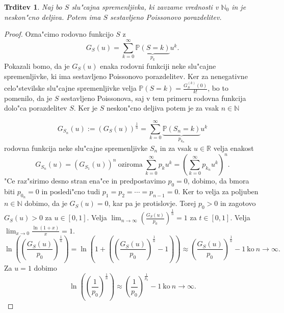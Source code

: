 \documentclass[12pt, a4paper, reqno]{amsart}
\theoremstyle{definition}
\theoremstyle{plain}
\newtheorem{trditev}[definicija]{Trditev}
\newcommand{\R}{\mathbb{R}}
\newcommand{\N}{\mathbb{N}}
\newcommand{\Prob}{\mathbb{P}}
\newcommand{\1}{\mathds{1}}
\begin{document}
    \begin{trditev}
        Naj bo $S$ slu"cajna spremenljivka, ki zavzame vrednosti v $\N_0$ in je neskon"cno deljiva.
        Potem ima $S$ sestavljeno Poissonovo porazdelitev.
        \label{trd:neskoncnoDeljivaYslediCPD}
    \end{trditev}

    \begin{proof}
        Ozna"cimo rodovno funkcijo $S$ z 
        \begin{equation*}
            G_S(u) = \sum_{k = 0}^\infty \underbrace{\Prob\left(S = k\right)}_{p_k}u^k.
        \end{equation*} 
        Pokazali bomo, da je $G_S(u)$ enaka rodovni funkciji neke slu"cajne spremenljivke, ki ima sestavljeno
        Poissonovo porazdelitev. Ker za nenegativne celo"stevilske slu"cajne spremenljivke velja 
        $\Prob\left(S = k\right) = \frac{G_S^{(k)}(0)}{k!}$, bo to pomenilo, da je $S$ sestavljeno Poissonova, 
        saj v tem primeru rodovna funkcija dolo"ca porazdelitev $S$.
        Ker je $S$ neskon"cno deljiva potem je za vsak $n\in\N$ 

        \begin{equation*}
            G_{S_n}(u) := \left(G_S(u)\right)^{\frac{1}{n}} = 
            \sum_{k = 0}^\infty\underbrace{\Prob\left(S_n = k\right)}_{p_{k_n}}u^k
        \end{equation*}
        rodovna funkcija neke slu"cajne spremenljivke $S_n$ in za vsak $u\in\R$ velja enakost
        \begin{equation*}
            G_{S_n}(u) = \left(G_{S_1}(u)\right)^n \ \text{oziroma} \ 
            \sum_{k = 0}^\infty p_{k}u^k = \left(\sum_{k = 0}^\infty p_{k_n}u^k\right)^n.
        \end{equation*}
        "Ce raz"sirimo desno stran ena"ce in predpostavimo $p_0 = 0$, dobimo, da bmora biti 
        $p_{0_n} = 0$ in posledi"cno tudi $p_1 = p_2 = \cdots = p_{n-1} = 0$. Ker to velja za poljuben 
        $n\in\N$ dobimo, da je $G_S(u) = 0$, kar pa je protislovje. Torej $p_0 > 0$ in zagotovo 
        $G_S(u) > 0$ za $u\in[0, 1]$. Velja $\lim_{n\to\infty}\left(\frac{G_S(u)}{p_0}\right)^{\frac{1}{n}} = 1$ za $t\in[0, 1]$.
        Velja $\lim_{x \to 0}\frac{\ln(1 + x)}{x} = 1.$
        \begin{equation*}
            \ln\left(\left(\frac{G_S(u)}{p_0}\right)^{\frac{1}{n}}\right) = \ln\left( 1 + \left(\left(\frac{G_S(u)}{p_0}\right)^{\frac{1}{n}} - 1\right)\right)
            \approx \left(\frac{G_S(u)}{p_0}\right)^{\frac{1}{n}} - 1 \ \text{ko} \ n\to\infty.
        \end{equation*}
        Za $u = 1$ dobimo
        \begin{equation*}
            \ln\left(\left(\frac{1}{p_0}\right)^{\frac{1}{n}}\right) \approx \left(\frac{1}{p_0}\right)^{\frac{1}{p_0}} - 1 \ \text{ko} \ n\to\infty.
        \end{equation*}



        

    \end{proof}
\end{document}
